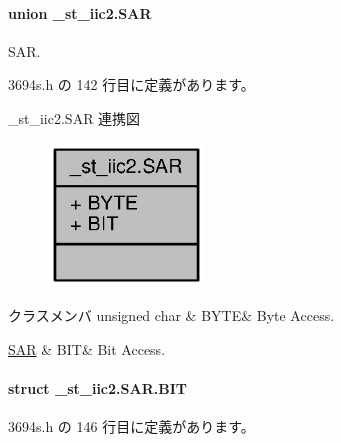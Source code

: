\paragraph{union \+\_\+st\+\_\+iic2.\+S\+A\+R}
S\+A\+R. 

 3694s.\+h の 142 行目に定義があります。



\+\_\+st\+\_\+iic2.\+S\+A\+R 連携図
\nopagebreak
\begin{figure}[H]
\begin{center}
\leavevmode
\includegraphics[width=118pt]{d7/dbe/union__st__iic2_8SAR__coll__graph}
\end{center}
\end{figure}
\begin{DoxyFields}{クラスメンバ}
unsigned char\label{3694s_8h_ae409eb2ba6eb6801f52763ae370c350e}
&
B\+Y\+T\+E&
Byte Access. \\
\hline

\hyperlink{3694s_8h_dc/df7/struct__st__iic2_8SAR_8BIT}{S\+A\+R}\label{3694s_8h_adb957fdc8000e1eef04a243f5199aa52}
&
B\+I\+T&
Bit Access. \\
\hline

\end{DoxyFields}
\label{struct__st__iic2_8SAR_8BIT}
\paragraph{struct \+\_\+st\+\_\+iic2.\+S\+A\+R.\+B\+I\+T}


 3694s.\+h の 146 行目に定義があります。



